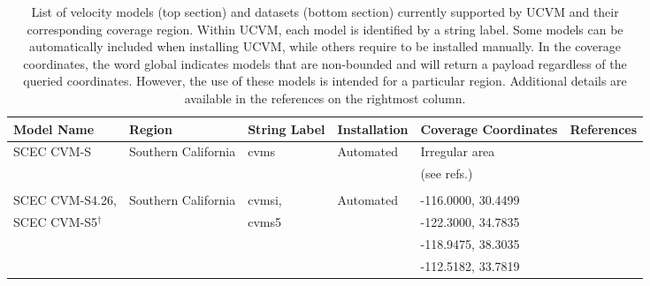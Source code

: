 
\begin{table*}%
\centering
\small
\caption{List of velocity models (top section) and datasets (bottom section) currently supported by UCVM and their corresponding coverage region. Within UCVM, each model is identified by a string label. Some models can be automatically included when installing UCVM, while others require to be installed manually. In the coverage coordinates, the word global indicates models that are non-bounded and will return a payload regardless of the queried coordinates. However, the use of these models is intended for a particular region. Additional details are available in the references on the rightmost column.}
\begin{tabular}[]{llllll}
Model Name         & Region                & String Label & Installation & Coverage Coordinates & References \\
\hline
SCEC CVM-S         & Southern California   & cvms          &  Automated   & Irregular area     & \citet{Magistrale_1996_BSSA} \\
                   &                       &               &              & (see refs.)        & \citet{Magistrale_2000_BSSA} \\
                   &                       &               &              &                    & \citet{Kohler_2003_BSSA}     \\
SCEC CVM-S4.26,    & Southern California   & cvmsi,        &  Automated   & -116.0000, 30.4499 & \citet{Chen_2011_Proc}       \\
SCEC CVM-S5$^\dagger$&                     & cvms5         &              & -122.3000, 34.7835 & \citet{Lee_2014_JGR}         \\
                   &                       &               &              & -118.9475, 38.3035 & \citet{Lee_2014_SRL}         \\
                   &                       &               &              & -112.5182, 33.7819 &                              \\

\end{tabular}
\end{table*}
